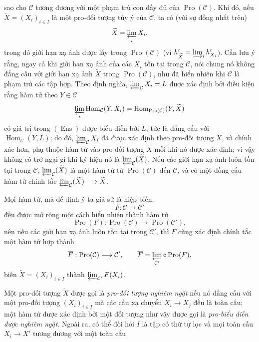 \documentclass[11pt,twoside,openany]{book}
\numberwithin{equation}{section}
\newcommand{\src}[1]{%
  \phantomsection\hypertarget{src:\fgasourceid:#1}{}%
  \marginpar{\raggedleft\footnotesize\sffamily #1}%
}
\newcommand{\fgasourceid}{unset}
\begin{document}
\src{372}
sao cho $\mathcal C$ tương đương với một phạm trù con đầy đủ của
$\operatorname{Pro}(\mathcal C)$. Khi đó, nếu
$\widetilde X=(X_i)_{i\in I}$ là một pro-đối tượng tùy ý của $\mathcal C$, ta
có (với sự đồng nhất trên)
\[
  \widetilde X=\varprojlim_i X_i,
\]
trong đó giới hạn xạ ảnh được lấy trong $\operatorname{Pro}(\mathcal C)$
(vì $h'_{\widetilde X}=\varinjlim_i h'_{X_i}$). Cần lưu ý rằng, ngay cả khi
giới hạn xạ ảnh của các $X_i$ tồn tại trong $\mathcal C$, nói chung nó không
đẳng cấu với giới hạn xạ ảnh $\widetilde X$ trong
$\operatorname{Pro}(\mathcal C)$, như đã hiển nhiên khi $\mathcal C$ là phạm
trù các tập hợp. Theo định nghĩa,
$\varprojlim_{\mathcal C}X_i=L$ được xác định bởi điều kiện rằng hàm tử theo
$Y\in\mathcal C$
\[
  \varprojlim_i\operatorname{Hom}_{\mathcal C}(Y,X_i)
  =\operatorname{Hom}_{\operatorname{Pro}(\mathcal C)}(Y,\widetilde X)
\]
có giá trị trong $(\operatorname{Ens})$ được biểu diễn bởi $L$, tức là đẳng
cấu với $\operatorname{Hom}_{\mathcal C}(Y,L)$; do đó,
$\varprojlim_{\mathcal C}X_i$ đã được xác định theo pro-đối tượng
$\widetilde X$, và chính xác hơn, phụ thuộc hàm tử vào pro-đối tượng
$\widetilde X$ mỗi khi nó được xác định; vì vậy không có trở ngại gì khi ký
hiệu nó là $\varprojlim_{\mathcal C}(\widetilde X)$. Nếu các giới hạn xạ ảnh
luôn tồn tại trong $\mathcal C$,
$\varprojlim_{\mathcal C}(\widetilde X)$ là một hàm tử từ
$\operatorname{Pro}(\mathcal C)$ đến $\mathcal C$, và có một đồng cấu hàm tử
chính tắc
$\varprojlim_{\mathcal C}(\widetilde X)\longrightarrow\widetilde X$.

Mọi hàm tử, mà để định ý ta giả sử là hiệp biến,
\[
  F:\mathcal C\longrightarrow\mathcal C'
\]
đều được mở rộng một cách hiển nhiên thành hàm tử
\[
  \operatorname{Pro}(F):\operatorname{Pro}(\mathcal C)
  \longrightarrow\operatorname{Pro}(\mathcal C'),
\]
nên nếu các giới hạn xạ ảnh luôn tồn tại trong $\mathcal C'$, thì $F$ cũng
xác định chính tắc một hàm tử hợp thành
\[
  \overline F:\operatorname{Pro}(\mathcal C)\longrightarrow\mathcal C',
  \qquad
  \overline F=\varprojlim_{\mathcal C'}\circ\operatorname{Pro}(F),
\]
biến $\widetilde X=(X_i)_{i\in I}$ thành
$\varprojlim_{\mathcal C'}F(X_i)$.

Một pro-đối tượng $\widetilde X$ được gọi là \emph{pro-đối tượng nghiêm ngặt}
nếu nó đẳng cấu với một pro-đối tượng $(X_i)_{i\in I}$ mà các cấu xạ chuyển
$X_i\longrightarrow X_j$ đều là toàn cấu; một hàm tử được xác định bởi một
đối tượng như vậy được gọi là \emph{pro-biểu diễn được nghiêm ngặt}. Ngoài
ra, có thể đòi hỏi $I$ là tập có thứ tự lọc và mọi toàn cấu
$X_i\longrightarrow X'$ tương đương với một toàn cấu
\end{document}
